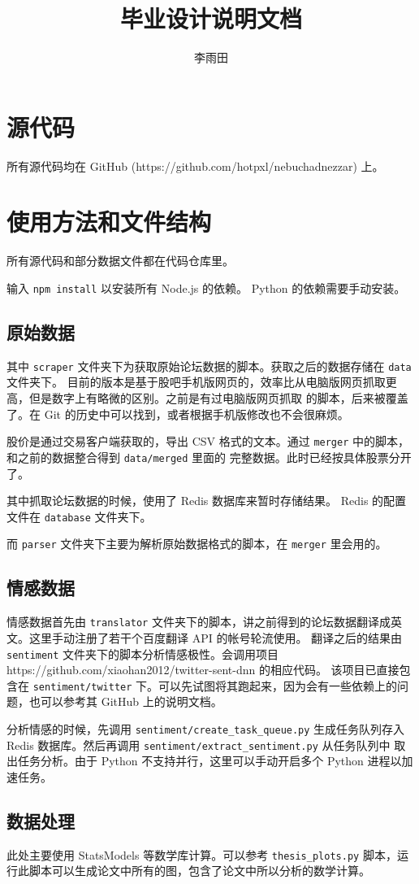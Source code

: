\documentclass{ctexart}
\begin{document}
\title{毕业设计说明文档}
\author{李雨田}
\maketitle
\section{源代码}
所有源代码均在 GitHub (https://github.com/hotpxl/nebuchadnezzar) 上。

\section{使用方法和文件结构}

所有源代码和部分数据文件都在代码仓库里。

输入 \texttt{npm install} 以安装所有 Node.js 的依赖。 Python 的依赖需要手动安装。

\subsection{原始数据}

其中 \texttt{scraper} 文件夹下为获取原始论坛数据的脚本。获取之后的数据存储在 \texttt{data} 文件夹下。
目前的版本是基于股吧手机版网页的，效率比从电脑版网页抓取更高，但是数字上有略微的区别。之前是有过电脑版网页抓取
的脚本，后来被覆盖了。在 Git 的历史中可以找到，或者根据手机版修改也不会很麻烦。

股价是通过交易客户端获取的，导出 CSV 格式的文本。通过 \texttt{merger} 中的脚本，和之前的数据整合得到 \texttt{data/merged} 里面的
完整数据。此时已经按具体股票分开了。

其中抓取论坛数据的时候，使用了 Redis 数据库来暂时存储结果。 Redis 的配置文件在 \texttt{database} 文件夹下。

而 \texttt{parser} 文件夹下主要为解析原始数据格式的脚本，在 \texttt{merger} 里会用的。

\subsection{情感数据}

情感数据首先由 \texttt{translator} 文件夹下的脚本，讲之前得到的论坛数据翻译成英文。这里手动注册了若干个百度翻译 API 的帐号轮流使用。
翻译之后的结果由 \texttt{sentiment} 文件夹下的脚本分析情感极性。会调用项目 https://github.com/xiaohan2012/twitter-sent-dnn 的相应代码。
该项目已直接包含在 \texttt{sentiment/twitter} 下。可以先试图将其跑起来，因为会有一些依赖上的问题，也可以参考其 GitHub 上的说明文档。

分析情感的时候，先调用 \texttt{sentiment/create\_task\_queue.py} 生成任务队列存入 Redis 数据库。然后再调用 \texttt{sentiment/extract\_sentiment.py} 从任务队列中
取出任务分析。由于 Python 不支持并行，这里可以手动开启多个 Python 进程以加速任务。

\subsection{数据处理}

此处主要使用 StatsModels 等数学库计算。可以参考 \texttt{thesis\_plots.py} 脚本，运行此脚本可以生成论文中所有的图，包含了论文中所以分析的数学计算。
\end{document}
